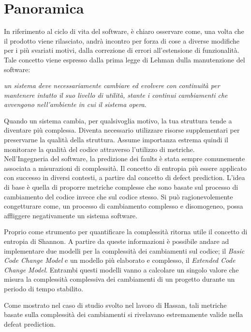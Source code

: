 \chapter{Panoramica}

In riferimento al ciclo di vita del software, è chiaro osservare come, una volta che il prodotto viene rilasciato, andrà incontro per forza di cose a diverse modifiche per i più svariati motivi, dalla correzione di errori all'estensione di funzionalità. Tale concetto viene espresso dalla prima legge di Lehman dulla manutenzione del software:
\begin{center}
\textit{un sistema deve necessariamente cambiare ed evolvere con continuità per mantenere intatto il suo livello di utilità, stante i continui cambiamenti che avvengono nell'ambiente in cui il sistema opera}.
\end{center}
Quando un sistema cambia, per qualsivoglia motivo, la tua struttura tende a diventare più complessa. Diventa necessario utilizzare risorse supplementari per preservarne la qualità della struttura. Assume importanza estrema quindi il monitorare la qualità del codice attraverso l'utilizzo di metriche.\\

Nell'Ingegneria del software, la predizione dei faults è stata sempre comunemente associata a misurazioni di complessità. Il concetto di entropia più essere applicato con successo in diversi contesti, a partire dal concetto di defect prediction. L'idea di base è quella di proporre metriche complesse che sono basate sul processo di cambiamento del codice invece che sul codice stesso. Si può ragionevolemente congetturare come, un processo di cambiamento complesso e disomogeneo, possa affliggere negativamente un sistema software. 

Proprio come strumento per quantificare la complessità ritorna utile il concetto di entropia di Shannon. A partire da queste informazioni è possibile andare ad implementare due modelli per la complessità dei cambiamenti sul codice; il \textit{Basic Code Change Model} e un modello più elaborato e complesso, il \textit{Extended Code Change Model}. Entrambi questi modelli vanno a calcolare un singolo valore che misura la complessità complessiva dei cambiamenti di un progetto durante un periodo di tempo stabilito. 

Come mostrato nel caso di studio svolto nel lavoro di Hassan, tali metriche basate sulla complessità dei cambiamenti si rivelavano estremamente valide nella defeat prediction.\\

